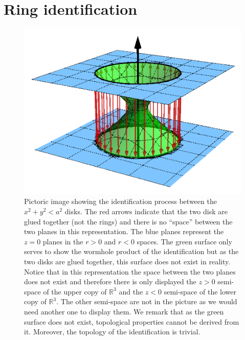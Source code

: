 \section{Ring identification}
  \begin{figure}   
\begin{center}
 \centerline{\includegraphics[width=.9\textwidth]{img/Chapter2/Identification.png}}
 \end{center}
 \caption{Pictoric image showing the identification process between the $x^2+y^2<a^2$ disks. The red arrows indicate that the two disk are glued together (not the rings) and there is no ``space'' between the two planes in this representation. The blue planes represent the $z=0$ planes in the $r>0$ and $r<0$ spaces. The green surface only serves to show the wormhole product of the identification but as the two disks are glued together, this surface does not exist in reality. Notice that in this representation the space between the two planes does not exist and therefore there is only displayed the $z>0$ semi-space of the upper copy of $\mathbb{R}^3$ and the $z<0$ semi-space of the lower copy of $\mathbb{R}^3$. The other semi-space are not in the picture as we would need another one to display them. We remark that as the green surface does not exist, topological properties cannot be derived from it. Moreover, the topology of the identification is trivial. }
 \label{fig:Identification}
\end{figure}  
